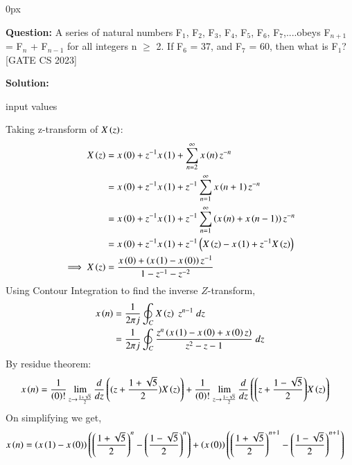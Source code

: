\documentclass[journal,12pt,onecolumn]{IEEEtran}
\begin{document}
	\parindent 0px
	
	
	\title{}
	\author{EE23BTECH11209 - K S Ballvardhan$^{*}$
	}
	\maketitle
	\bigskip
	
	
	
	\textbf{Question:} A series of natural numbers F$_1$, F$_2$, F$_3$, F$_4$, F$_5$, F$_6$, F$_7$,....obeys F$_{n+1}$ = F$_n$ + F$_{n-1}$ for all integers n $\geq$ 2.
	If F$_6$ = 37, and F$_7$ = 60, then what is F$_1$? \hfill[GATE CS 2023]
	
	\textbf{Solution: }
	
	\begin{table}[ht] 
		\centering
		
		\caption{input values}
		\label{tab: Table2023cs3}
	\end{table}
    Taking z-transform of $X\left(z\right)$:
	\begin{align}
		X\left(z\right) &= x\left(0\right) + z^{-1} x\left(1\right) + \sum_{n=2}^{\infty} x\left(n\right) z^{-n}\\
	    &= x\left(0\right) + z^{-1} x\left(1\right) + z^{-1} \sum_{n=1}^{\infty} x\left(n+1\right) z^{-n}\\
	    &= x\left(0\right) + z^{-1} x\left(1\right) + z^{-1} \sum_{n=1}^{\infty} \left(x\left(n\right) + x\left(n-1\right)\right)z^{-n} \\
	    &= x\left(0\right) + z^{-1} x\left(1\right) + z^{-1}\left(X\left(z\right)-x\left(1\right) + z^{-1}X\left(z\right)\right) \\
		\implies X\left(z\right)&= \frac{x\left(0\right) + \left(x\left(1\right)-x\left(0\right)\right)z^{-1}}{1-z^{-1}-z^{-2}}
	\end{align}
	Using Contour Integration to find the inverse $Z$-transform,
	\begin{align}
		x\left(n\right) &=\frac{1}{2\pi j}\oint_{C} X\left(z\right) \;z^{n-1} \;dz  \\
		&=\frac{1}{2\pi j}\oint_{C}\frac{z^{n}\left(x\left(1\right)-x\left(0\right)+x\left(0\right) z\right)}{z^2-z-1} \;dz 
	\end{align}
	By residue theorem:
	\begin{align}
		x\left(n\right) &=\frac{1}{\left(0\right)!}\lim\limits_{z\to {\frac{1+\sqrt{5}}{2}}}\frac{d}{dz}\left({(z+\frac{1+\sqrt{5}}{2})}X\left(z\right)\right) + \frac{1}{\left(0\right)!}\lim\limits_{z\to \frac{1-\sqrt{5}}{2}}\frac{d}{dz}\left({\left(z+\frac{1-\sqrt{5}}{2}\right)}X\left(z\right)\right)
	\end{align}
	On simplifying we get,
	\begin{align}
		x\left(n\right) &= \left(x\left(1\right)-x\left(0\right)\right)\left(\left(\frac{1+\sqrt{5}}{2}\right)^n-\left(\frac{1-\sqrt{5}}{2}\right)^n\right) + \left(x\left(0\right)\right)\left(\left(\frac{1+\sqrt{5}}{2}\right)^{n+1}-\left(\frac{1-\sqrt{5}}{2}\right)^{n+1}\right)
	\end{align}
\end{document}
